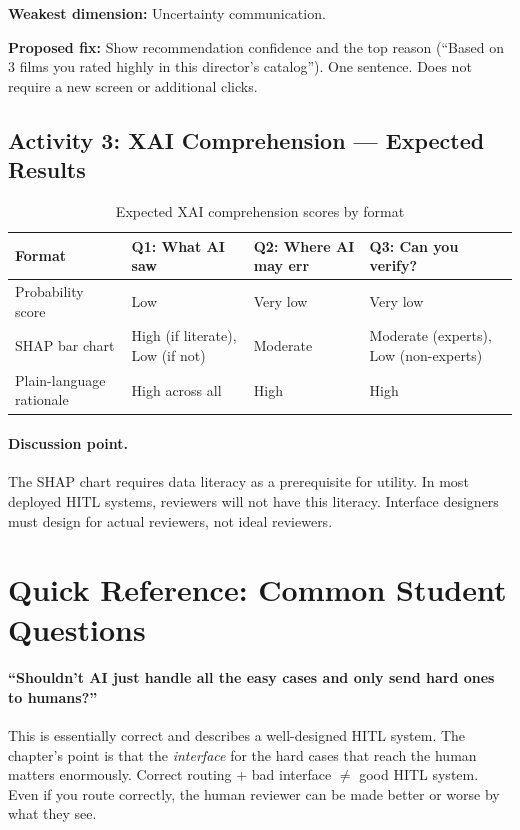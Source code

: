 \textbf{Weakest dimension:} Uncertainty communication.

\textbf{Proposed fix:} Show recommendation confidence and the top reason (``Based on 3 films you rated highly in this director's catalog''). One sentence. Does not require a new screen or additional clicks.

\subsection{Activity 3: XAI Comprehension --- Expected Results}

\begin{table}[htbp]
\caption{Expected XAI comprehension scores by format}
\label{tab:xai-comprehension-ch06}
\centering
\begin{tabular}{@{}p{3.5cm}p{3cm}p{3cm}p{3cm}@{}}
\toprule
\textbf{Format} & \textbf{Q1: What AI saw} & \textbf{Q2: Where AI may err} & \textbf{Q3: Can you verify?} \\
\midrule
Probability score & Low & Very low & Very low \\
SHAP bar chart & High (if literate), Low (if not) & Moderate & Moderate (experts), Low (non-experts) \\
Plain-language rationale & High across all & High & High \\
\bottomrule
\end{tabular}
\end{table}

\paragraph{Discussion point.} The SHAP chart requires data literacy as a prerequisite for utility. In most deployed HITL systems, reviewers will not have this literacy. Interface designers must design for actual reviewers, not ideal reviewers.

\section{Quick Reference: Common Student Questions}

\paragraph{``Shouldn't AI just handle all the easy cases and only send hard ones to humans?''}
This is essentially correct and describes a well-designed HITL system. The chapter's point is that the \emph{interface} for the hard cases that reach the human matters enormously. Correct routing + bad interface $\neq$ good HITL system. Even if you route correctly, the human reviewer can be made better or worse by what they see.

